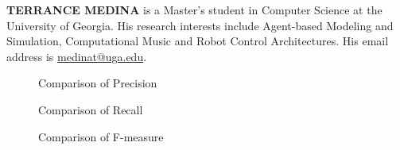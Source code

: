 \documentclass[letterpaper,twocolumn,12pt]{article}
\begin{document}
\vspace{8 pt}
\noindent \textbf{TERRANCE MEDINA} is a Master's student in Computer Science at the University of Georgia.  
His research interests include Agent-based Modeling and Simulation, Computational Music and Robot Control Architectures.
His email address is \href{mailto:medinat@uga.edu}{medinat@uga.edu}.




\onecolumn
\begin{sidewaysfigure}
\centering
\tiny{}
\caption{Comparison of Precision}
\label{fig:precision}
\end{sidewaysfigure}

\begin{sidewaysfigure}
\centering
\tiny{}
\caption{Comparison of Recall}
\label{fig:recall}
\end{sidewaysfigure}

\begin{sidewaysfigure}
\centering
\tiny{}
\caption{Comparison of F-measure}
\label{fig:fmeasure}
\end{sidewaysfigure}
\end{document}
